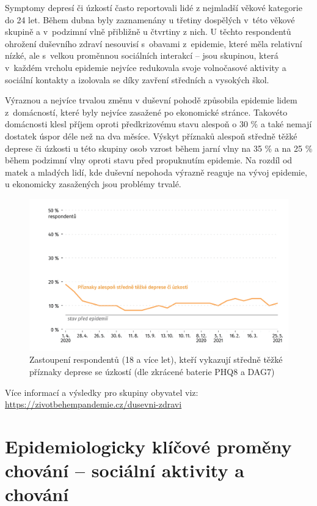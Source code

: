 Symptomy depresí či úzkostí často reportovali lidé z nejmladší věkové kategorie do 24 let. Během dubna byly zaznamenány u třetiny dospělých v této věkové skupině a v podzimní vlně přibližně u čtvrtiny z nich. U těchto respondentů ohrožení duševního zdraví nesouvisí s obavami z epidemie, které měla relativní nízké, ale s velkou proměnnou sociálních interakcí – jsou skupinou, která v každém vrcholu epidemie nejvíce redukovala svoje volnočasové aktivity a sociální kontakty a izolovala se díky zavření středních a vysokých škol.

Výraznou a nejvíce trvalou změnu v duševní pohodě způsobila epidemie lidem z domácností, které byly nejvíce zasažené po ekonomické stránce. Takovéto domácnosti klesl příjem oproti předkrizovému stavu alespoň o 30 \% a také nemají dostatek úspor déle než na dva měsíce. Výskyt příznaků alespoň středně těžké deprese či úzkosti u této skupiny osob vzrost během jarní vlny na 35 \% a na 25 \% během podzimní vlny oproti stavu před propuknutím epidemie. Na rozdíl od matek a mladých lidí, kde duševní nepohoda výrazně reaguje na vývoj epidemie, u ekonomicky zasažených jsou problémy trvalé.


\begin{figure}[ht]
    \centering
    \includegraphics[width=\textwidth]{./pic/zbp-graf2.png}
    \caption{Zastoupení respondentů (18 a více let), kteří vykazují středně těžké příznaky deprese se úzkostí (dle zkrácené baterie PHQ8 a DAG7)}
    \label{fig:zbp2}
\end{figure}

Více informací a výsledky pro skupiny obyvatel viz: \url{https://zivotbehempandemie.cz/dusevni-zdravi}


\section*{Epidemiologicky klíčové proměny chování – sociální aktivity a chování}
\label{Epidemi_promeny}

